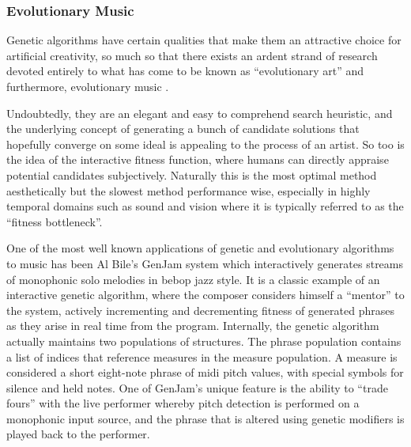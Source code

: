 \subsubsection{Evolutionary Music}

Genetic algorithms have certain qualities that make them an attractive choice for artificial creativity, so much so that there exists an ardent strand of research devoted entirely to what has come to be known as “evolutionary art” \cite{Romero2008, McCormack2013} and furthermore, evolutionary music \cite{Miranda2007a} .

Undoubtedly, they are an elegant and easy to comprehend search heuristic, and the underlying concept of generating a bunch of candidate solutions that hopefully converge on some ideal is appealing to the process of an artist. So too is the idea of the interactive fitness function, where humans can directly appraise potential candidates subjectively. Naturally this is the most optimal method aesthetically but the slowest method performance wise, especially in highly temporal domains such as sound and vision where it is typically referred to as the “fitness bottleneck”. 

One of the most well known applications of genetic and evolutionary algorithms to music has been Al Bile’s GenJam system which interactively generates streams of monophonic solo melodies in bebop jazz style.  It is a classic example of an interactive genetic algorithm, where the composer considers himself a “mentor” to the system, actively incrementing and decrementing fitness of generated phrases as they arise in real time from the program. Internally, the genetic algorithm actually maintains two populations of structures. The phrase population contains a list of indices that reference measures in the measure population. A measure is considered a short eight-note phrase of \acrshort{midi} pitch values, with special symbols for silence and held notes.  One of GenJam's unique feature is the ability to “trade fours” with the live performer whereby pitch detection is performed on a monophonic input source, and the phrase that is altered using genetic modifiers is played back to the performer.

